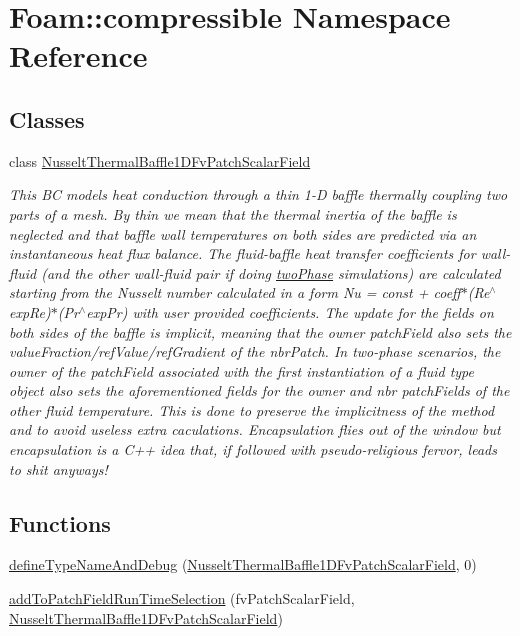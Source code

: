 \hypertarget{namespaceFoam_1_1compressible}{}\section{Foam\+:\+:compressible Namespace Reference}
\label{namespaceFoam_1_1compressible}
\subsection*{Classes}
\begin{DoxyCompactItemize}
\item 
class \hyperlink{classFoam_1_1compressible_1_1NusseltThermalBaffle1DFvPatchScalarField}{Nusselt\+Thermal\+Baffle1\+D\+Fv\+Patch\+Scalar\+Field}
\begin{DoxyCompactList}\small\item\em This BC models heat conduction through a thin 1-\/D baffle thermally coupling two parts of a mesh. By \textquotesingle{}thin\textquotesingle{} we mean that the thermal inertia of the baffle is neglected and that baffle wall temperatures on both sides are predicted via an instantaneous heat flux balance. The fluid-\/baffle heat transfer coefficients for wall-\/fluid (and the other wall-\/fluid pair if doing \hyperlink{classFoam_1_1twoPhase}{two\+Phase} simulations) are calculated starting from the Nusselt number calculated in a form Nu = const + coeff$\ast$(Re$^\wedge$exp\+Re)$\ast$(Pr$^\wedge$exp\+Pr) with user provided coefficients. The update for the fields on both sides of the baffle is implicit, meaning that the owner patch\+Field also sets the value\+Fraction/ref\+Value/ref\+Gradient of the nbr\+Patch. In two-\/phase scenarios, the owner of the patch\+Field associated with the first instantiation of a fluid type object also sets the aforementioned fields for the owner and nbr patch\+Fields of the other fluid temperature. This is done to preserve the implicitness of the method and to avoid useless extra caculations. Encapsulation flies out of the window but encapsulation is a C++ idea that, if followed with pseudo-\/religious fervor, leads to shit anyways! \end{DoxyCompactList}\end{DoxyCompactItemize}
\subsection*{Functions}
\begin{DoxyCompactItemize}
\item 
\hyperlink{namespaceFoam_1_1compressible_a24b0ca5e01315f9f3189f5f84f7bc59f}{define\+Type\+Name\+And\+Debug} (\hyperlink{classFoam_1_1compressible_1_1NusseltThermalBaffle1DFvPatchScalarField}{Nusselt\+Thermal\+Baffle1\+D\+Fv\+Patch\+Scalar\+Field}, 0)
\item 
\hyperlink{namespaceFoam_1_1compressible_aa0ae99239c75310cdeeb4a90ed2a4407}{add\+To\+Patch\+Field\+Run\+Time\+Selection} (fv\+Patch\+Scalar\+Field, \hyperlink{classFoam_1_1compressible_1_1NusseltThermalBaffle1DFvPatchScalarField}{Nusselt\+Thermal\+Baffle1\+D\+Fv\+Patch\+Scalar\+Field})
\end{DoxyCompactItemize}


